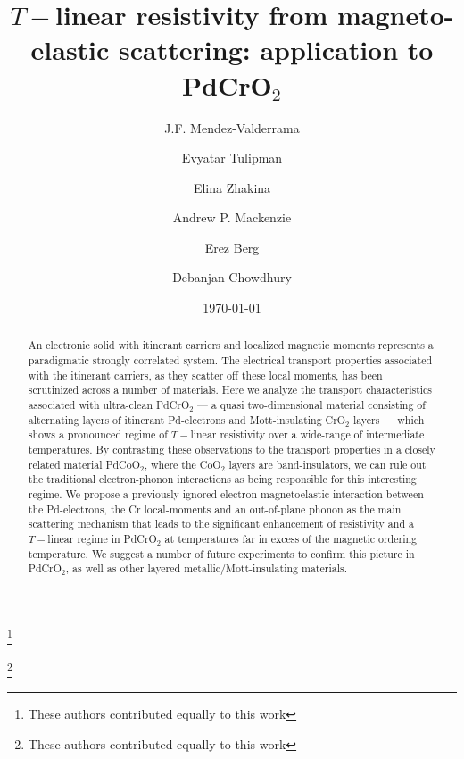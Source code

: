 \documentclass[aps,prl,twocolumn,superscriptaddress,amsmath,nofootinbib,10pt,floatfix]{revtex4-2}
\begin{document}
\title{$T-$linear resistivity from magneto-elastic scattering: application to PdCrO$_2$}

\author{J.F. Mendez-Valderrama} \thanks{These authors contributed equally to this work}
\author{Evyatar Tulipman} \thanks{These authors contributed equally to this work}
\author{Elina Zhakina}
\author{Andrew P. Mackenzie}
\author{Erez Berg}
\author{Debanjan Chowdhury}


\date{\today}

\begin{abstract}
An electronic solid with itinerant carriers and localized magnetic moments represents a paradigmatic strongly correlated system. The electrical transport properties associated with the itinerant carriers, as they scatter off these local moments, has been scrutinized across a number of materials. Here we analyze the transport characteristics associated with ultra-clean PdCrO$_2$ --- a quasi two-dimensional material consisting of alternating layers of itinerant Pd-electrons and Mott-insulating CrO$_2$ layers --- which shows a pronounced regime of $T-$linear resistivity over a wide-range of intermediate temperatures. By contrasting these observations to the transport properties in a closely related material PdCoO$_2$, where the CoO$_2$ layers are band-insulators, we can rule out the traditional electron-phonon interactions as being responsible for this interesting regime. We propose a previously ignored electron-magnetoelastic interaction between the Pd-electrons, the Cr local-moments and an out-of-plane phonon as the main scattering mechanism that leads to the significant enhancement of resistivity and a $T-$linear regime in PdCrO$_2$ at temperatures far in excess of the magnetic ordering temperature. We suggest a number of future experiments to confirm this picture in PdCrO$_2$, as well as other layered metallic/Mott-insulating materials.     
\end{abstract}
\end{document}
